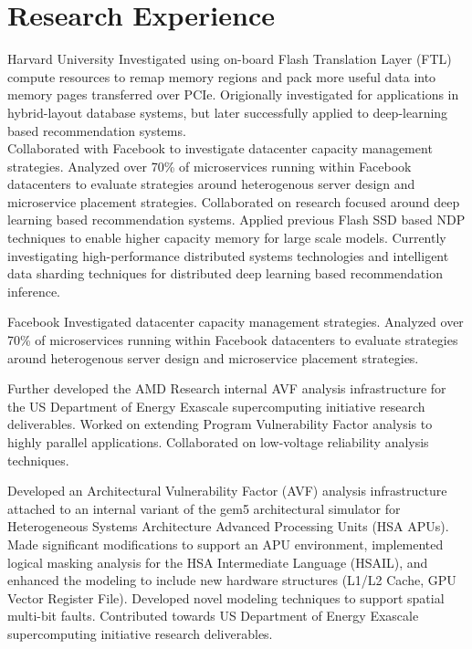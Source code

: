 \section{Research Experience}

 {Harvard University}{}
  { Investigated using on-board Flash Translation Layer (FTL) compute resources to remap memory regions and pack more useful data into memory pages transferred over PCIe. Origionally investigated for applications in hybrid-layout database systems, but later successfully applied to deep-learning based recommendation systems. \\
    Collaborated with Facebook to investigate datacenter capacity management strategies. Analyzed over 70\% of microservices running within Facebook datacenters to evaluate strategies around heterogenous server design and microservice placement strategies.
    Collaborated on research focused around deep learning based recommendation systems. Applied previous Flash SSD based NDP techniques to enable higher capacity memory for large scale models. Currently investigating high-performance distributed systems technologies and intelligent data sharding techniques for distributed deep learning based recommendation inference.
  }

 {Facebook}{}
  {
    Investigated datacenter capacity management strategies. Analyzed over 70\% of microservices running within Facebook datacenters to evaluate strategies around heterogenous server design and microservice placement strategies.
  }

  { Further developed the AMD Research internal AVF analysis infrastructure for the US Department of Energy Exascale supercomputing initiative research deliverables. Worked on extending Program Vulnerability Factor analysis to highly parallel applications. Collaborated on low-voltage reliability analysis techniques. \\
  }

  { Developed an Architectural Vulnerability Factor (AVF) analysis infrastructure attached to an internal variant of the gem5 architectural simulator for Heterogeneous Systems Architecture Advanced Processing Units (HSA APUs). Made significant modifications to support an APU environment, implemented logical masking analysis for the HSA Intermediate Language (HSAIL), and enhanced the modeling to include new hardware structures (L1/L2 Cache, GPU Vector Register File). Developed novel modeling techniques to support spatial multi-bit faults. Contributed towards US Department of Energy Exascale supercomputing initiative research deliverables. \\
  }

